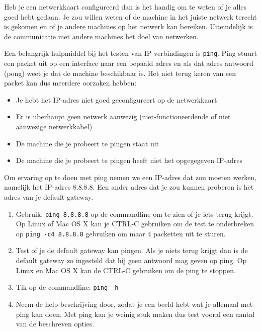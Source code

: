 Heb je een netwerkkaart configureerd dan is het handig om te weten of je alles goed hebt gedaan. Je zou willen weten of de machine in het juiste netwerk terecht is gekomen en of je andere machines op het netwerk kan bereiken. Uiteindelijk is de communicatie met andere machines het doel van netwerken.

Een belangrijk hulpmiddel bij het testen van IP verbindingen is \texttt{ping}. Ping stuurt een packet uit op een interface naar een bepaald adres en als dat adres antwoord (pong) weet je dat de machine beschikbaar is. Het niet terug keren van een packet kan dus meerdere oorzaken hebben:
\begin{itemize}
\item Je hebt het IP-adres niet goed geconfigureert op de netwerkkaart
\item Er is uberhaupt geen netwerk aanwezig (niet-functioneerdende of niet aanwezige netwerkkabel)
\item De machine die je probeert te pingen staat uit
\item De machine die je probeert te pingen heeft niet het opgegegeven IP-adres
\end{itemize}

Om ervaring op te doen met ping nemen we een IP-adres dat  zou moeten werken, namelijk het IP-adres 8.8.8.8. Een ander adres dat je zou kunnen proberen is het adres van je default gateway.

\begin{enumerate}
\item Gebruik: \texttt{ping 8.8.8.8} op de commandline om te zien of je iets terug krijgt. Op Linux of Mac OS X kan je CTRL-C gebruiken om de test te onderbreken op \texttt{ping -c4 8.8.8.8} gebruiken om maar 4 packetten uit te sturen.
\item Test of je de default gateway kan pingen. Als je niets terug krijgt dan is de default gateway zo ingesteld dat hij geen antwoord mag geven op ping. Op Linux en Mac OS X kan de CTRL-C gebruiken om de ping te stoppen.
\item Tik op de commandline: \texttt{ping -h}
\item Neem de help beschrijving door, zodat je een beeld hebt wat je allemaal met ping kan doen. Met ping kan je weinig stuk maken dus test vooral een aantal van de beschreven opties.
\end{enumerate}
